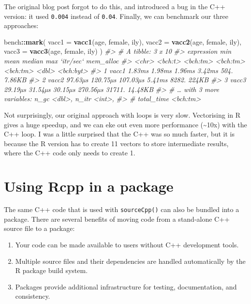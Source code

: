 \documentclass[]{book}
\newenvironment{Shaded}{\begin{snugshade}}{\end{snugshade}}
\newcommand{\CommentTok}[1]{\textcolor[rgb]{0.37,0.37,0.37}{\textit{#1}}}
\newcommand{\DataTypeTok}[1]{\textcolor[rgb]{0.27,0.27,0.27}{#1}}
\newcommand{\KeywordTok}[1]{\textcolor[rgb]{0.27,0.27,0.27}{\textbf{#1}}}
\newcommand{\NormalTok}[1]{#1}
\newcommand{\OperatorTok}[1]{\textcolor[rgb]{0.43,0.43,0.43}{\textbf{#1}}}
\begin{document}
The original blog post forgot to do this, and introduced a bug in the C++ version: it used \texttt{0.004} instead of \texttt{0.04}. Finally, we can benchmark our three approaches:

\begin{Shaded}
\begin{Highlighting}[]
\NormalTok{bench}\OperatorTok{::}\KeywordTok{mark}\NormalTok{(}
  \DataTypeTok{vacc1 =} \KeywordTok{vacc1}\NormalTok{(age, female, ily),}
  \DataTypeTok{vacc2 =} \KeywordTok{vacc2}\NormalTok{(age, female, ily),}
  \DataTypeTok{vacc3 =} \KeywordTok{vacc3}\NormalTok{(age, female, ily)}
\NormalTok{)}
\CommentTok{#> # A tibble: 3 x 10}
\CommentTok{#>   expression     min     mean   median      max `itr/sec` mem_alloc}
\CommentTok{#>   <chr>      <bch:t> <bch:tm> <bch:tm> <bch:tm>     <dbl> <bch:byt>}
\CommentTok{#> 1 vacc1       1.83ms   1.98ms   1.96ms   3.42ms      504.    7.86KB}
\CommentTok{#> 2 vacc2      97.63µs 120.75µs 107.03µs   5.41ms     8282.     224KB}
\CommentTok{#> 3 vacc3      29.19µs  31.54µs  30.15µs 270.56µs    31711.   14.48KB}
\CommentTok{#> # … with 3 more variables: n_gc <dbl>, n_itr <int>,}
\CommentTok{#> #   total_time <bch:tm>}
\end{Highlighting}
\end{Shaded}

Not surprisingly, our original approach with loops is very slow. Vectorising in R gives a huge speedup, and we can eke out even more performance (\textasciitilde{}10x) with the C++ loop. I was a little surprised that the C++ was so much faster, but it is because the R version has to create 11 vectors to store intermediate results, where the C++ code only needs to create 1.

\hypertarget{rcpp-package}{%
\section{Using Rcpp in a package}\label{rcpp-package}}

The same C++ code that is used with \texttt{sourceCpp()} can also be bundled into a package. There are several benefits of moving code from a stand-alone C++ source file to a package: 

\begin{enumerate}
\def\labelenumi{\arabic{enumi}.}
\item
  Your code can be made available to users without C++ development tools.
\item
  Multiple source files and their dependencies are handled automatically by
  the R package build system.
\item
  Packages provide additional infrastructure for testing, documentation, and
  consistency.
\end{enumerate}
\end{document}
